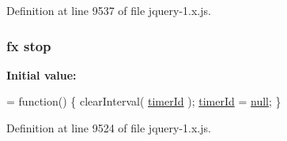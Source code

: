 Definition at line 9537 of file jquery-\/1.\+x.\+js.

\subsubsection[{\texorpdfstring{stop}{stop}}]{ {\bf fx} stop}\hypertarget{jquery-1_8x_8js_ac9a544302040b74e845b33c285cd10e7}{}\label{jquery-1_8x_8js_ac9a544302040b74e845b33c285cd10e7}
{\bfseries Initial value\+:}
\begin{DoxyCode}
= \textcolor{keyword}{function}() \{
    clearInterval( \hyperlink{jquery-1_8x_8js_aa447439fbe7027e58837a297297c9d8a}{timerId} );
    \hyperlink{jquery-1_8x_8js_aa447439fbe7027e58837a297297c9d8a}{timerId} = \hyperlink{modernizr_8min_8js_a286f9ec831c5e676eeb493248eab9575}{null};
\}
\end{DoxyCode}


Definition at line 9524 of file jquery-\/1.\+x.\+js.

